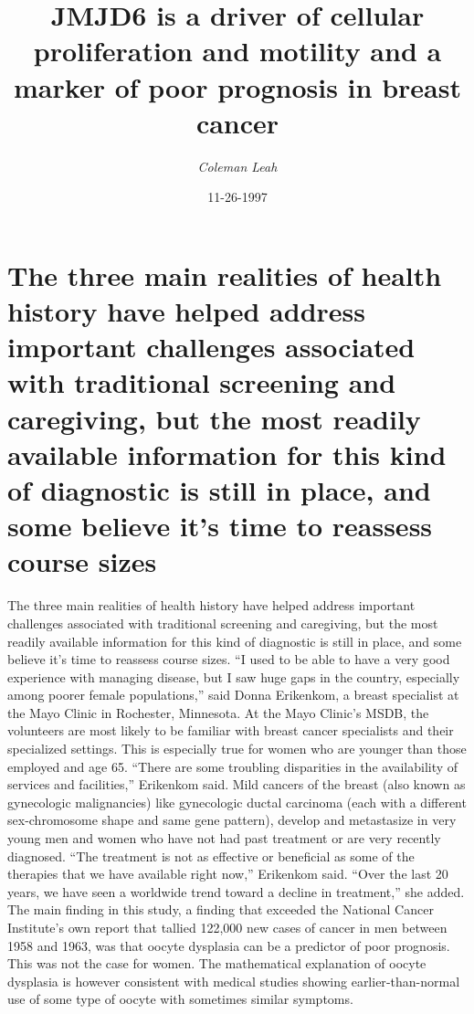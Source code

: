\documentclass{article}%
\title{JMJD6 is a driver of cellular proliferation and motility and a marker of poor prognosis in breast cancer}%
\author{\textit{Coleman Leah}}%
\date{11-26-1997}%
\begin{document}
%
\normalsize%
\maketitle%
\section{The three main realities of health history have helped address important challenges associated with traditional screening and caregiving, but the most readily available information for this kind of diagnostic is still in place, and some believe it’s time to reassess course sizes}%
\label{sec:Thethreemainrealitiesofhealthhistoryhavehelpedaddressimportantchallengesassociatedwithtraditionalscreeningandcaregiving,butthemostreadilyavailableinformationforthiskindofdiagnosticisstillinplace,andsomebelieveitstimetoreassesscoursesizes}%
The three main realities of health history have helped address important challenges associated with traditional screening and caregiving, but the most readily available information for this kind of diagnostic is still in place, and some believe it’s time to reassess course sizes.\newline%
“I used to be able to have a very good experience with managing disease, but I saw huge gaps in the country, especially among poorer female populations,” said Donna Erikenkom, a breast specialist at the Mayo Clinic in Rochester, Minnesota.\newline%
At the Mayo Clinic’s MSDB, the volunteers are most likely to be familiar with breast cancer specialists and their specialized settings. This is especially true for women who are younger than those employed and age 65.\newline%
“There are some troubling disparities in the availability of services and facilities,” Erikenkom said.\newline%
Mild cancers of the breast (also known as gynecologic malignancies) like gynecologic ductal carcinoma (each with a different sex{-}chromosome shape and same gene pattern), develop and metastasize in very young men and women who have not had past treatment or are very recently diagnosed.\newline%
“The treatment is not as effective or beneficial as some of the therapies that we have available right now,” Erikenkom said.\newline%
“Over the last 20 years, we have seen a worldwide trend toward a decline in treatment,” she added.\newline%
The main finding in this study, a finding that exceeded the National Cancer Institute’s own report that tallied 122,000 new cases of cancer in men between 1958 and 1963, was that oocyte dysplasia can be a predictor of poor prognosis. This was not the case for women. The mathematical explanation of oocyte dysplasia is however consistent with medical studies showing earlier{-}than{-}normal use of some type of oocyte with sometimes similar symptoms.\newline%
\end{document}
